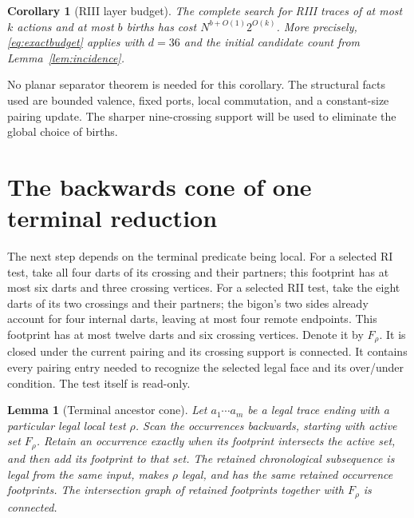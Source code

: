 \documentclass[11pt]{article}
\newtheorem{lemma}[theorem]{Lemma}
\newtheorem{corollary}[theorem]{Corollary}
\theoremstyle{definition}
\begin{document}
\begin{corollary}[RIII layer budget]
\label{cor:r3layer}
The complete search for RIII traces of at most $k$ actions and at most
$b$ births has cost $N^{b+O(1)}2^{O(k)}$. More precisely,
\eqref{eq:exactbudget} applies with $d=36$ and the initial candidate
count from Lemma~\ref{lem:incidence}.
\end{corollary}

No planar separator theorem is needed for this corollary. The structural
facts used are bounded valence, fixed ports, local commutation, and a
constant-size pairing update. The sharper nine-crossing support will be
used to eliminate the global choice of births.

\section{The backwards cone of one terminal reduction}
\label{sec:cone}

The next step depends on the terminal predicate being local. For a selected
RI test, take all four darts of its crossing and their partners; this
footprint has at most six darts and three crossing vertices. For a selected
RII test, take the eight darts of its two crossings and their partners;
the bigon's two sides already account for four internal darts, leaving at
most four remote endpoints. This footprint has at most twelve darts and
six crossing vertices. Denote it by $F_\rho$. It is closed under the
current pairing and its crossing support is connected. It contains
every pairing entry needed to recognize the selected legal face and its
over/under condition. The test itself is read-only.

\begin{lemma}[Terminal ancestor cone]
\label{lem:cone}
Let $a_1\cdots a_m$ be a legal trace ending with a particular legal local
test $\rho$. Scan the occurrences backwards, starting with active set
$F_\rho$. Retain an occurrence exactly when its footprint intersects the
active set, and then add its footprint to that set. The retained
chronological subsequence is legal from the same input, makes $\rho$
legal, and has the same retained occurrence footprints. The intersection
graph of retained footprints together with $F_\rho$ is connected.
\end{lemma}
\end{document}
